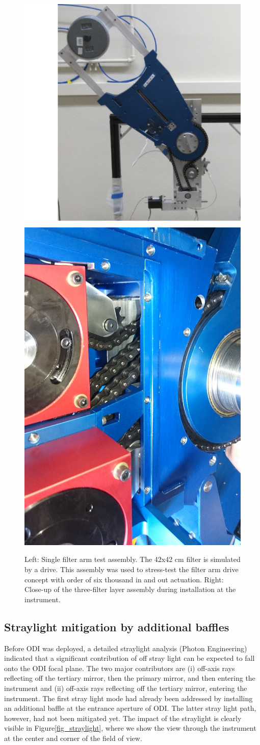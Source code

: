 \documentclass[]{spieman}
\begin{document}
\begin{figure}[]
	
	\includegraphics[height=0.49\columnwidth]{images/filterdrivetest.png}
	\includegraphics[height=0.49\columnwidth]{images/DSC_0309.JPG}
	\caption{\label{fig_filterdrive} Left: Single filter arm test assembly. The 
	42x42 cm filter is simulated by a drive. This assembly was used to 
	stress-test the filter arm drive concept with order of six thousand in and 
	out actuation. Right: Close-up of the three-filter layer assembly during 
	installation at the instrument.   }
\end{figure}



\subsection{Straylight mitigation by additional baffles}

Before ODI was deployed, a detailed straylight analysis (Photon Engineering)
indicated that a significant contribution of off stray light can be expected to
fall onto the ODI focal plane. The two major contributors are (i) off-axis rays
reflecting off the tertiary mirror, then the primary mirror, and then entering
the instrument and (ii) off-axis rays reflecting off the tertiary mirror,
entering the instrument. The first stray light mode had already been addressed
by installing an additional baffle at the entrance aperture of ODI. The latter
stray light path, however, had not been mitigated yet. The impact of the
straylight is clearly visible in Figure\ref{fig_straylight}, where we show the
view through the instrument at the center and corner of the field of view.
\end{document}
